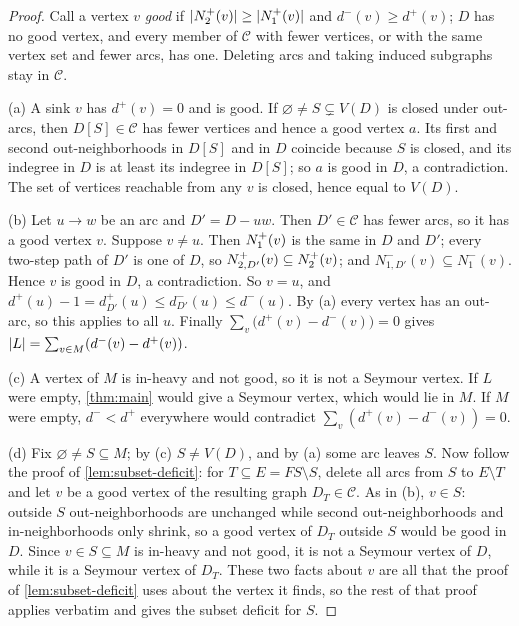 \begin{proof}
Call a vertex $v$ \emph{good} if $\lvert N^+_2(v)\rvert\ge\lvert N^+_1(v)\rvert$ and $d^-(v)\ge d^+(v)$;
$D$ has no good vertex, and every member of $\mathcal C$ with fewer vertices, or with the
same vertex set and fewer arcs, has one. Deleting arcs and taking induced subgraphs
stay in $\mathcal C$.

(a) A sink $v$ has $d^+(v)=0$ and is good. If $\varnothing\ne S\subsetneq V(D)$ is closed
under out-arcs, then $D[S]\in\mathcal C$ has fewer vertices and hence a good vertex $a$. Its
first and second out-neighborhoods in $D[S]$ and in $D$ coincide because $S$ is closed,
and its indegree in $D$ is at least its indegree in $D[S]$; so $a$ is good in $D$, a
contradiction. The set of vertices reachable from any $v$ is closed, hence equal to
$V(D)$.

(b) Let $u\to w$ be an arc and $D'=D-uw$. Then $D'\in\mathcal C$ has fewer arcs, so it has a
good vertex $v$. Suppose $v\ne u$. Then $N^+_1(v)$ is the same in $D$ and $D'$; every
two-step path of $D'$ is one of $D$, so $N^+_{2,D'}(v)\subseteq N^+_2(v)$; and
$N^-_{1,D'}(v)\subseteq N^-_1(v)$. Hence $v$ is good in $D$, a contradiction. So $v=u$,
and $d^+(u)-1=d^+_{D'}(u)\le d^-_{D'}(u)\le d^-(u)$. By (a) every vertex has an out-arc,
so this applies to all $u$. Finally $\sum_v\bigl(d^+(v)-d^-(v)\bigr)=0$ gives
$\lvert L\rvert=\sum_{v\in M}(d^-(v)-d^+(v))$.

(c) A vertex of $M$ is in-heavy and not good, so it is not a Seymour vertex. If $L$ were
empty, \cref{thm:main} would give a Seymour vertex, which would lie in $M$. If $M$
were empty, $d^-<d^+$ everywhere would contradict $\sum_v(d^+(v)-d^-(v))=0$.

(d) Fix $\varnothing\ne S\subseteq M$; by (c) $S\ne V(D)$, and by (a) some arc leaves $S$.
Now follow the proof of \cref{lem:subset-deficit}: for $T\subseteq E=FS\setminus S$,
delete all arcs from $S$ to $E\setminus T$ and let $v$ be a good vertex of the resulting
graph $D_T\in\mathcal C$. As in (b), $v\in S$: outside $S$ out-neighborhoods are unchanged
while second out-neighborhoods and in-neighborhoods only shrink, so a good vertex of
$D_T$ outside $S$ would be good in $D$. Since $v\in S\subseteq M$ is in-heavy and not
good, it is not a Seymour vertex of $D$, while it is a Seymour vertex of $D_T$. These
two facts about $v$ are all that the proof of \cref{lem:subset-deficit} uses about the
vertex it finds, so the rest of that proof applies verbatim and gives the subset
deficit for $S$.
\end{proof}

